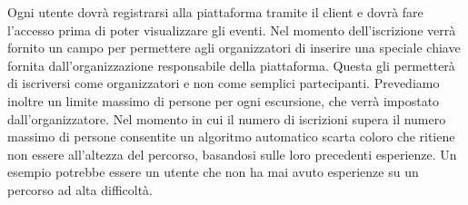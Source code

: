 Ogni utente dovrà registrarsi alla piattaforma tramite il client e dovrà fare l’accesso prima di poter visualizzare gli eventi. Nel momento dell’iscrizione verrà fornito un campo per permettere agli organizzatori di inserire una speciale chiave fornita dall’organizzazione responsabile della piattaforma. Questa gli permetterà di iscriversi come organizzatori e non come semplici partecipanti.
Prevediamo inoltre un limite massimo di persone per ogni escursione, che verrà impostato dall’organizzatore. Nel momento in cui il numero di iscrizioni supera il numero massimo di persone consentite un algoritmo automatico scarta coloro che ritiene non essere all’altezza del percorso, basandosi sulle loro precedenti esperienze. Un esempio potrebbe essere un utente che non ha mai avuto esperienze su un percorso ad alta difficoltà.